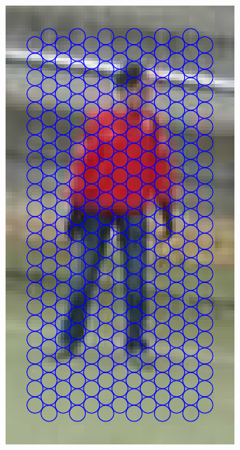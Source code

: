 \documentclass[thesis.tex]{subfiles}
\begin{document}
\begin{figure}
	\centering
	\begin{subfigure}[t]{0.3\textwidth}
		\includegraphics[width=\textwidth]{img/inriaExampleCells.pdf}
		\caption{}
		\label{fig:inriaExampleCells}
		\vspace{2mm}
	\end{subfigure}

\end{figure}
\end{document}
